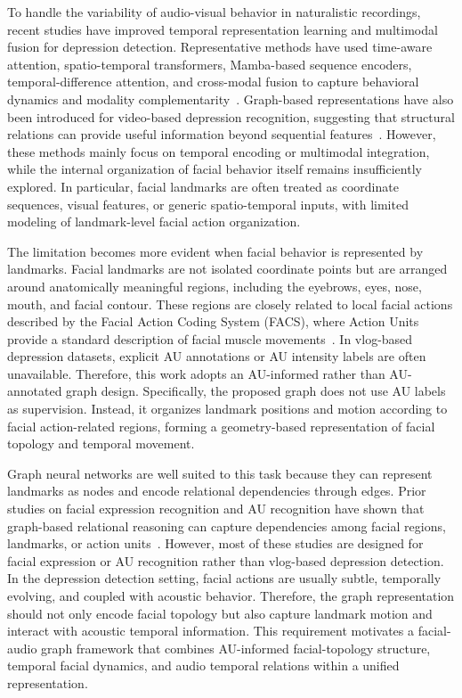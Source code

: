 \documentclass[conference]{IEEEtran}
\begin{document}
To handle the variability of audio-visual behavior in naturalistic recordings, recent studies have improved temporal representation learning and multimodal fusion for depression detection. Representative methods have used time-aware attention, spatio-temporal transformers, Mamba-based sequence encoders, temporal-difference attention, and cross-modal fusion to capture behavioral dynamics and modality complementarity~\cite{zhou2023tamfn,tao2024depmstat,xing2024emomamba,liu2024mddmamba,hu2024sedcfn,jia2024bmbrt,zhang2024mtdan,zhao2025decoupled}. Graph-based representations have also been introduced for video-based depression recognition, suggesting that structural relations can provide useful information beyond  sequential features~\cite{xu2025twostage}.  However, these methods mainly focus on temporal encoding or multimodal integration, while the internal organization of facial behavior itself remains insufficiently explored. 
In particular, facial landmarks are often treated as coordinate sequences, visual features, or generic spatio-temporal inputs, with limited modeling of landmark-level facial action organization.

The limitation becomes more evident when facial behavior is represented by landmarks. Facial landmarks are not isolated coordinate points but are arranged around anatomically meaningful regions, including the eyebrows, eyes, nose, mouth, and facial contour. These regions are closely related to local facial actions described by the Facial Action Coding System (FACS), where Action Units  provide a standard description of facial muscle movements~\cite{ekman1978facs,baltrusaitis2016openface,baltrusaitis2018openface}. 
In vlog-based depression datasets, explicit AU annotations or AU intensity labels are often unavailable. Therefore, this work adopts an AU-informed rather than AU-annotated graph design.
Specifically, the proposed graph does not use AU labels as supervision. 
Instead, it organizes landmark positions and motion according to facial action-related regions, forming a geometry-based representation of facial topology and temporal movement.


Graph neural networks are well suited to this task because they can represent landmarks as nodes and encode relational dependencies through edges.
Prior studies on facial expression recognition and AU recognition have shown that graph-based relational reasoning can capture dependencies among facial regions, landmarks, or action units~\cite{song2021uncertain,ge2024mgrr,liao2022fergcn}. However, most of these studies are designed for facial expression or AU recognition rather than vlog-based depression detection. In the depression detection setting, facial actions are usually subtle, temporally evolving, and coupled with acoustic behavior. Therefore, the graph representation should not only encode facial topology but also capture landmark motion and interact with acoustic temporal information.
This requirement motivates a facial-audio graph framework that combines AU-informed facial-topology structure, temporal facial dynamics, and audio temporal relations within a unified representation.
\end{document}
